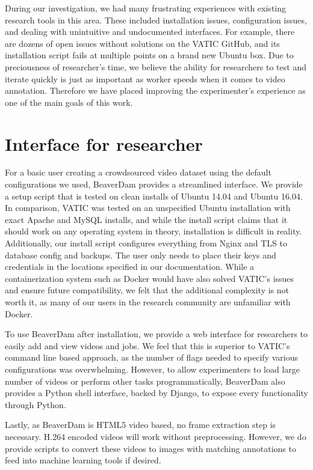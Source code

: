 
During our investigation, we had many frustrating experiences with existing research tools in this area.
These included installation issues, configuration issues, and dealing with unintuitive and undocumented interfaces.
For example, there are dozens of open issues without solutions on the VATIC GitHub, 
and its installation script fails at multiple points on a brand new Ubuntu box. 
Due to preciousness of researcher's time,
we believe the ability for researchers to test and iterate quickly is just as important as worker speeds when it comes to video annotation.
Therefore we have placed improving the experimenter's experience as one of the main goals of this work.

\section{Interface for researcher}

For a basic user creating a crowdsourced video dataset using the default configurations we used, 
BeaverDam provides a streamlined interface.
We provide a setup script that is tested on clean installs of Ubuntu 14.04 and Ubuntu 16.04.
In comparison, VATIC was tested on an unspecified Ubuntu installation with exact Apache and MySQL installs,
and while the install script claims that it should work on any operating system in theory, 
installation is difficult in reality. 
Additionally, our install script configures everything from Nginx and TLS to database config and backups.
The user only needs to place their keys and credentials in the locations specified in our documentation.
While a containerization system such as Docker would have also solved VATIC's issues and ensure future compatibility,
we felt that the additional complexity is not worth it, as many of our users in the research community are unfamiliar with Docker. 

To use BeaverDam after installation, we provide a web interface for researchers to easily add and view videos and jobs.
We feel that this is superior to VATIC's command line based approach, 
as the number of flags needed to specify various configurations was overwhelming. 
However, to allow experimenters to load large number of videos or perform other tasks programmatically, 
BeaverDam also provides a Python shell interface, backed by Django, to expose every functionality through Python.

Lastly, as BeaverDam is HTML5 video based, no frame extraction step is necessary.
H.264 encoded videos will work without preprocessing.
However, we do provide scripts to convert these videos to images with matching annotations to feed into machine learning tools if desired.

